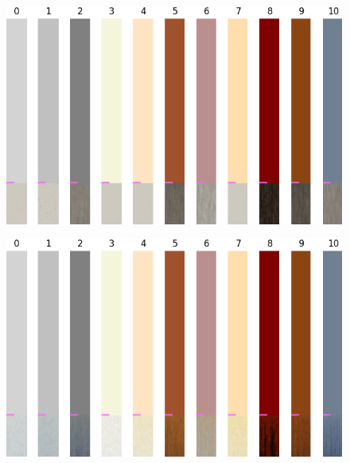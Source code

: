 \begin{itemize}
        \begin{figure}[H]
            \centering
            \begin{minipage}{0.45\textwidth}
                \centering
                \includegraphics[width=\textwidth]{imgs/ColorTest_2.1.7.1_OldData.png} 
                \label{fig:test1_M0_Cit}
            \end{minipage}
            \hfill
            \begin{minipage}{0.45\textwidth}
                \centering
                \includegraphics[width=\textwidth]{imgs/ColorTest_2.1.8.1_128.png} 
                \label{fig:test1_M1_Cit}
            \end{minipage}
    

\end{figure}
\end{itemize}
